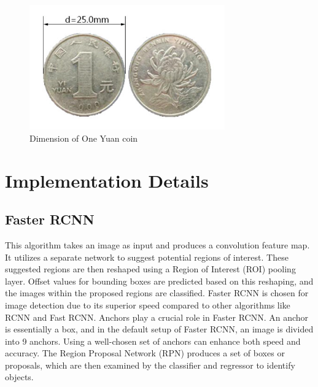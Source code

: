 \documentclass[12pt, a4paper, twoside]{article}
\begin{document}
\begin{figure}[p]
	\centering
	\includegraphics[width=0.75\textwidth]{coin}
	\caption{Dimension of One Yuan coin}
	\label{F:coin}
\end{figure}

\section{Implementation Details}
\subsection{Faster RCNN}
This algorithm\cite{rcnn} takes an image as input and produces a convolution feature map. It utilizes a separate network to suggest potential regions of interest. These suggested regions are then reshaped using a Region of Interest (ROI) pooling layer. Offset values for bounding boxes are predicted based on this reshaping, and the images within the proposed regions are classified. Faster RCNN is chosen for image detection due to its superior speed compared to other algorithms like RCNN and Fast RCNN. Anchors play a crucial role in Faster RCNN. An anchor is essentially a box, and in the default setup of Faster RCNN, an image is divided into 9 anchors. Using a well-chosen set of anchors can enhance both speed and accuracy. The Region Proposal Network (RPN) produces a set of boxes or proposals, which are then examined by the classifier and regressor to identify objects.
\end{document}
